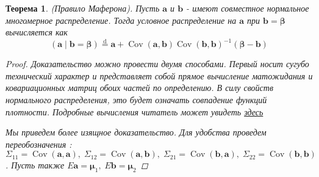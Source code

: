 \documentclass[12pt, twoside]{article}
\newcommand{\ba}{{\mathbf{a}}}
\newcommand{\bb}{{\mathbf{b}}}
\newcommand{\mub}{{\boldsymbol{\mu}}}
\newtheorem{theorem}{Теорема}
\begin{document}
\begin{theorem}
(Правило Маферона). Пусть $\ba$ и $\bb$ - имеют совместное нормальное многомерное распределение. Тогда условное распределение на $\ba$ при $\bb = \mathbf{\beta}$ вычисляется как 
\begin{equation}
(\boldsymbol{a} \mid \boldsymbol{b}=\boldsymbol{\beta}) \stackrel{\mathrm{d}}{=} \boldsymbol{a}+\operatorname{Cov}(\boldsymbol{a}, \boldsymbol{b}) \operatorname{Cov}(\boldsymbol{b}, \boldsymbol{b})^{-1}(\boldsymbol{\beta}-\boldsymbol{b})
\end{equation}

\begin{proof}
Доказательство можно провести двумя способами. Первый носит сугубо технический характер и представляет собой прямое вычисление матожидания и ковариационных матриц обоих частей по определению. В силу свойств нормального распределения, это будет означать совпадение функций плотности. Подробные вычисления читатель может увидеть 
\href{http://fourier.eng.hmc.edu/e161/lectures/gaussianprocess/node7.html}{здесь}

Мы приведем более изящное доказательство. Для удобства проведем переобозначения : $\Sigma_{11} = \operatorname{Cov}(\ba, \ba), \; \Sigma_{12} = \operatorname{Cov}(\ba, \bb), \; \Sigma_{21} = \operatorname{Cov}(\bb, \ba), \; \Sigma_{22} = \operatorname{Cov}(\bb, \bb) $. Пусть также $E \ba = \mub_1, \; E \bb = \mub_2$


\end{proof}
\end{theorem}
\end{document}
